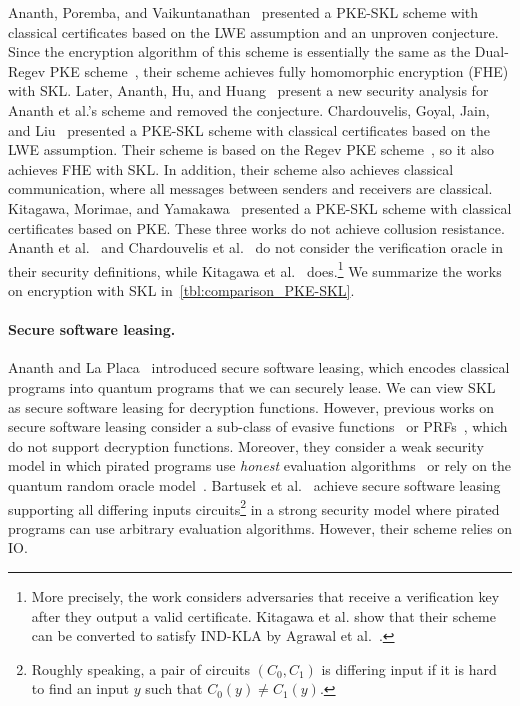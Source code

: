 Ananth, Poremba, and Vaikuntanathan~\cite{TCC:AnaPorVai23} presented a PKE-SKL scheme with classical certificates based on the LWE assumption and an unproven conjecture.
Since the encryption algorithm of this scheme is essentially the same as the Dual-Regev PKE scheme~\cite{STOC:GenPeiVai08}, their scheme achieves fully homomorphic encryption (FHE) with SKL. Later, Ananth, Hu, and Huang~\cite{TCC:AnaHuHua24} present a new security analysis for Ananth et al.'s scheme and removed the conjecture.
Chardouvelis, Goyal, Jain, and Liu~\cite{EPRINT:CGJL23} presented a PKE-SKL scheme with classical certificates based on the LWE assumption. Their scheme is based on the Regev PKE scheme~\cite{JACM:Regev09}, so it also achieves FHE with SKL. In addition, their scheme also achieves classical communication, where all messages between senders and receivers are classical.
Kitagawa, Morimae, and Yamakawa~\cite{myEPRINT:KitMorYam24} presented
a PKE-SKL scheme with classical certificates based on PKE.
These three works do not achieve collusion resistance.
Ananth et al.~\cite{TCC:AnaPorVai23,TCC:AnaHuHua24} and Chardouvelis et al.~\cite{EPRINT:CGJL23} do not consider the verification oracle in their security definitions, while Kitagawa et al.~\cite{myEPRINT:KitMorYam24} does.\footnote{More precisely, the work considers adversaries that receive a verification key after they output a valid certificate. Kitagawa et al. show that their scheme can be converted to satisfy IND-KLA by Agrawal et al.~\cite{EC:AKNYY23}.}
We summarize the works on encryption with SKL in~\cref{tbl:comparison_PKE-SKL}.

\paragraph{Secure software leasing.}
Ananth and La Placa~\cite{EC:AnaLaP21} introduced secure software
leasing, which encodes classical programs into quantum programs that
we can securely lease. We can view SKL as secure software leasing for
decryption functions. However, previous works on secure software
leasing consider a sub-class of evasive
functions~\cite{EC:AnaLaP21,ARXIV:ColMajPor20,TCC:KitNisYam21,TCC:BJLPS21}
or PRFs~\cite{TCC:KitNisYam21}, which do not support decryption
functions. Moreover, they consider a weak security model in which
pirated programs use \emph{honest} evaluation
algorithms~\cite{EC:AnaLaP21,TCC:KitNis23,TCC:BJLPS21} or rely on the
quantum random oracle model~\cite{ARXIV:ColMajPor20}. Bartusek et
al.~\cite{EC:BGKMRR24} achieve secure software leasing supporting all
differing inputs circuits\footnote{Roughly speaking, a pair of
circuits $(C_0,C_1)$ is differing input if it is hard to find an input
$y$ such that $C_0(y)\ne C_1(y)$.} in a strong security model where
pirated programs can use arbitrary evaluation algorithms. However, their scheme relies on IO.



